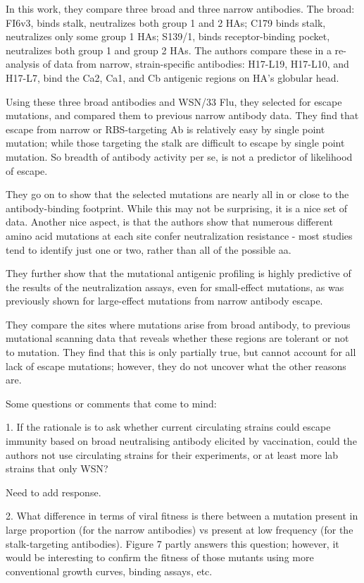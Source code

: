 \documentclass[11pt, oneside]{article}   	%
\begin{document}
In this work, they compare three broad and three narrow antibodies. The broad: FI6v3, binds stalk, neutralizes both group 1 and 2 HAs; C179 binds stalk, neutralizes only some group 1 HAs; S139/1, binds receptor-binding pocket, neutralizes both group 1 and group 2 HAs. The authors compare these in a re-analysis of data from narrow, strain-specific antibodies: H17-L19, H17-L10, and H17-L7, bind the Ca2, Ca1, and Cb antigenic regions on HA's globular head.

Using these three broad antibodies and WSN/33 Flu, they selected for escape mutations, and compared them to previous narrow antibody data. They find that escape from narrow or RBS-targeting Ab is relatively easy by single point mutation; while those targeting the stalk are difficult to escape by single point mutation. So breadth of antibody activity per se, is not a predictor of likelihood of escape.

They go on to show that the selected mutations are nearly all in or close to the antibody-binding footprint. While this may not be surprising, it is a nice set of data. Another nice aspect, is that the authors show that numerous different amino acid mutations at each site confer neutralization resistance - most studies tend to identify just one or two, rather than all of the possible aa.

They further show that the mutational antigenic profiling is highly predictive of the
results of the neutralization assays, even for small-effect mutations, as was previously shown for large-effect mutations from narrow antibody escape.

They compare the sites where mutations arise from broad antibody, to previous mutational scanning data that reveals whether these regions are tolerant or not to mutation. They find that this is only partially true, but cannot account for all lack of escape mutations; however, they do not uncover what the other reasons are.

Some questions or comments that come to mind:

1. If the rationale is to ask whether current circulating strains could escape immunity based on broad neutralising antibody elicited by vaccination, could the authors not use circulating strains for their experiments, or at least more lab strains that only WSN?

{\color{red}
Need to add response.}

2. What difference in terms of viral fitness is there between a mutation present in large proportion (for the narrow antibodies) vs present at low frequency (for the stalk-targeting antibodies). Figure 7 partly answers this question; however, it would be interesting to confirm the fitness of those mutants using more conventional growth curves, binding assays, etc.
\end{document}
